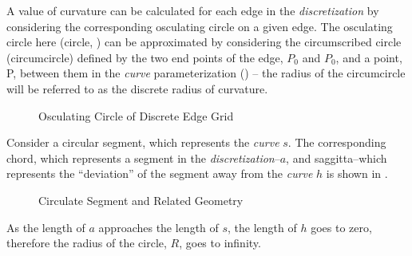 A value of curvature can be calculated for each edge in the \textit{discretization} by considering the corresponding osculating circle on a given edge. The osculating circle here (circle, ) can be approximated by considering the circumscribed circle (circumcircle) \cite{casey1888} defined by the two end points of the edge, $P_0$ and $P_0$, and a point, P, between them in the \textit{curve} parameterization () -- the radius of the circumcircle will be referred to as the discrete radius of curvature.

\begin{figure}[h!]
  \caption{\label{fig:CircumscribedCircle} Osculating Circle of Discrete Edge Grid}
\end{figure}


Consider a circular segment, which represents the \textit{curve} $s$.  The corresponding chord, which represents a segment in the \textit{discretization}--$a$, and saggitta--which represents the ``deviation'' of the segment away from the \textit{curve} $h$ is shown in .

\begin{figure}
  \caption{\label{fig:CircleGeometry} Circulate Segment and Related Geometry \cite{weissteineSagitta}}
\end{figure}

\begin{theorem}
As the length of $a$ approaches the length of $s$, the length of $h$ goes 
to zero, therefore the radius of the circle, $R$, goes to infinity.  
\end{theorem}

